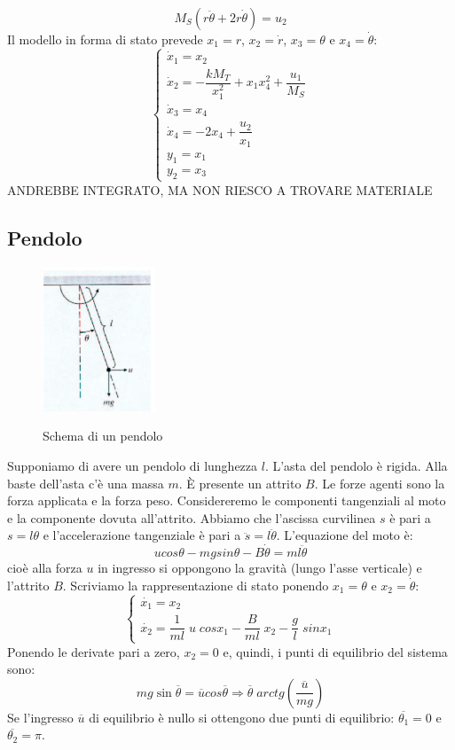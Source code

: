 \documentclass[a4paper]{report}
\begin{document}
\[
  M_S (r \ddot{\theta} + 2r \dot{\theta}) = u_2
\]
Il modello in forma di stato prevede $x_1 = r$, $x_2 = \dot{r}$, $x_3
= \theta$ e $x_4 = \dot{\theta}$:
\[
  \left\{
  \begin{array}{l}
    \dot{x}_1 = x_2\\
    \dot{x}_2 = - \dfrac{k M_T}{x_1^2} + x_1 x_4^2 +
    \dfrac{u_1}{M_S}\\
    \dot{x}_3 = x_4\\
    \dot{x}_4 = -2 x_4 + \dfrac{u_2}{x_1}\\
    y_1 = x_1\\
    y_2 = x_3
  \end{array}
  \right .
\]
ANDREBBE INTEGRATO, MA NON RIESCO A TROVARE MATERIALE

\subsection{Pendolo}\label{pendolo}
\begin{figure}[!h]
  \centering
  \includegraphics[width=0.3\textwidth]{./images/pendolo.png}
  \label{fig:pendolo}
  \caption{Schema di un pendolo\label{fig:pendolo}}
\end{figure}
Supponiamo di avere un pendolo di lunghezza $l$. L'asta del pendolo
\`e rigida. Alla baste dell'asta c'\`e una massa $m$. \`E presente un
attrito $B$. Le forze agenti
sono la forza applicata e la forza peso. Considereremo le componenti
tangenziali al moto e la componente dovuta all'attrito. Abbiamo che
l'ascissa curvilinea $s$ \`e pari a $s = l \theta$ e l'accelerazione
tangenziale \`e pari a $\ddot{s} = l \ddot{\theta}$. L'equazione del
moto \`e:
\begin{equation}
  u cos\theta - mg sin\theta - B \dot{\theta} = m l \ddot{\theta}
\end{equation}
cio\`e alla forza $u$ in ingresso si oppongono la gravit\`a (lungo
l'asse verticale) e l'attrito $B$.
Scriviamo la rappresentazione di stato ponendo $x_1 = \theta$ e $x_2 =
\dot{\theta}$:
\[
  \left\{
  \begin{array}{l}
    \dot{x_1} = x_2\\
    \dot{x_2} = \dfrac{1}{ml}\;u\;cos{x_1} - \dfrac{B}{ml}\;x_2 -
    \dfrac{g}{l}\;sin{x_1}
  \end{array}\right .
\]
Ponendo le derivate pari a zero, $x_2 = 0$ e, quindi, i punti di
equilibrio del sistema sono:
$$mg\sin{\overline{\theta}} = \overline{u}cos{\overline{\theta}}
\Rightarrow \overline{\theta} \;arctg
\left(\frac{\overline{u}}{mg}\right)$$
Se l'ingresso $\overline{u}$ di equilibrio \`e nullo si ottengono due
punti di equilibrio:
$\overline{\theta_1} = 0$ e $\overline{\theta_2} = \pi$.
\end{document}
